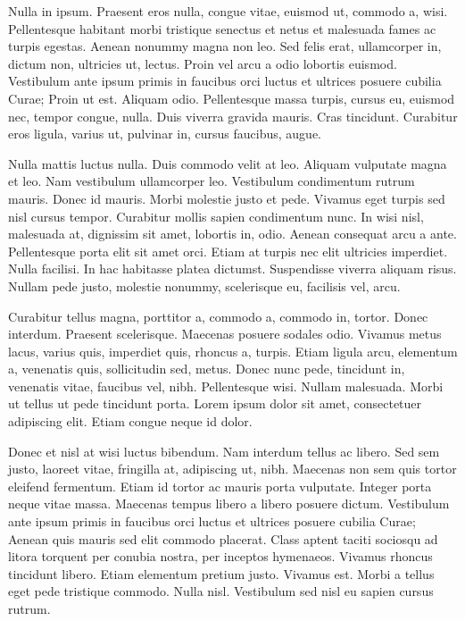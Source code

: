 \documentclass{article}
\begin{document}
Nulla in ipsum. Praesent eros nulla, congue vitae, euismod ut, commodo a,
wisi. Pellentesque habitant morbi tristique senectus et netus et malesuada
fames ac turpis egestas. Aenean nonummy magna non leo. Sed felis erat,
ullamcorper in, dictum non, ultricies ut, lectus. Proin vel arcu a odio
lobortis euismod. Vestibulum ante ipsum primis in faucibus orci luctus et
ultrices posuere cubilia Curae; Proin ut est. Aliquam odio. Pellentesque massa
turpis, cursus eu, euismod nec, tempor congue, nulla. Duis viverra gravida
mauris. Cras tincidunt. Curabitur eros ligula, varius ut, pulvinar in, cursus
faucibus, augue.

Nulla mattis luctus nulla. Duis commodo velit at leo. Aliquam vulputate magna
et leo. Nam vestibulum ullamcorper leo. Vestibulum condimentum rutrum mauris.
Donec id mauris. Morbi molestie justo et pede. Vivamus eget turpis sed nisl
cursus tempor. Curabitur mollis sapien condimentum nunc. In wisi nisl,
malesuada at, dignissim sit amet, lobortis in, odio. Aenean consequat arcu a
ante. Pellentesque porta elit sit amet orci. Etiam at turpis nec elit ultricies
imperdiet. Nulla facilisi. In hac habitasse platea dictumst. Suspendisse
viverra aliquam risus. Nullam pede justo, molestie nonummy, scelerisque eu,
facilisis vel, arcu.

Curabitur tellus magna, porttitor a, commodo a, commodo in, tortor. Donec
interdum. Praesent scelerisque. Maecenas posuere sodales odio. Vivamus metus
lacus, varius quis, imperdiet quis, rhoncus a, turpis. Etiam ligula arcu,
elementum a, venenatis quis, sollicitudin sed, metus. Donec nunc pede,
tincidunt in, venenatis vitae, faucibus vel, nibh. Pellentesque wisi. Nullam
malesuada. Morbi ut tellus ut pede tincidunt porta. Lorem ipsum dolor sit amet,
consectetuer adipiscing elit. Etiam congue neque id dolor.

Donec et nisl at wisi luctus bibendum. Nam interdum tellus ac libero. Sed
sem justo, laoreet vitae, fringilla at, adipiscing ut, nibh. Maecenas non sem
quis tortor eleifend fermentum. Etiam id tortor ac mauris porta vulputate.
Integer porta neque vitae massa. Maecenas tempus libero a libero posuere
dictum. Vestibulum ante ipsum primis in faucibus orci luctus et ultrices
posuere cubilia Curae; Aenean quis mauris sed elit commodo placerat. Class
aptent taciti sociosqu ad litora torquent per conubia nostra, per inceptos
hymenaeos. Vivamus rhoncus tincidunt libero. Etiam elementum pretium justo.
Vivamus est. Morbi a tellus eget pede tristique commodo. Nulla nisl. Vestibulum
sed nisl eu sapien cursus rutrum.
\end{document}
